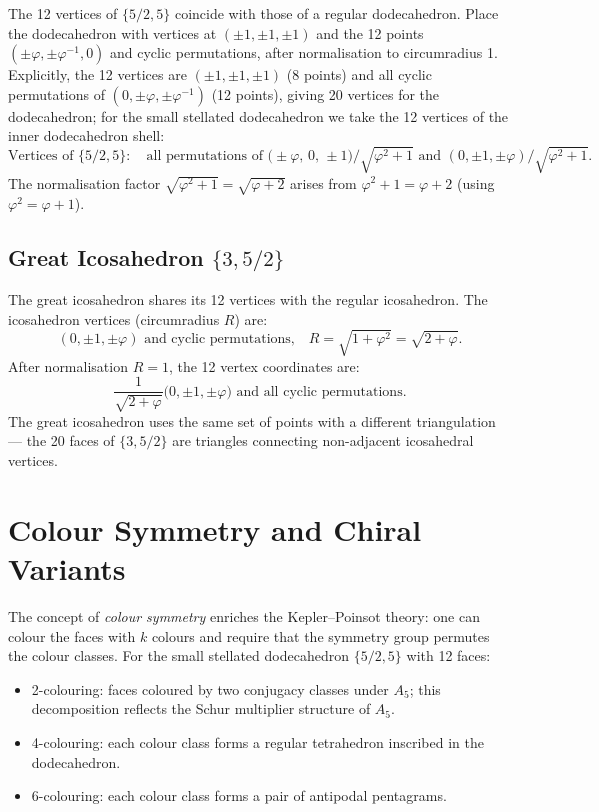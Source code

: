 The 12 vertices of $\{5/2,5\}$ coincide with those of a
regular dodecahedron.  Place the dodecahedron with vertices
at $(\pm 1, \pm 1, \pm 1)$ and the 12 points
$(\pm\varphi, \pm\varphi^{-1}, 0)$ and cyclic permutations,
after normalisation to circumradius 1.  Explicitly, the 12
vertices are $(\pm 1, \pm 1, \pm 1)$ (8 points) and all cyclic
permutations of $(0, \pm\varphi, \pm\varphi^{-1})$ (12 points),
giving 20 vertices for the dodecahedron; for the
small stellated dodecahedron we take the 12 vertices of the
inner dodecahedron shell:
\[
  \text{Vertices of }\{5/2,5\}:\quad
  \text{all permutations of }
  \bigl(\pm\varphi,\, 0,\, \pm 1\bigr)/\sqrt{\varphi^2+1}
  \text{ and }(0,\pm 1,\pm\varphi)/\sqrt{\varphi^2+1}.
\]
The normalisation factor $\sqrt{\varphi^2+1} = \sqrt{\varphi+2}$
arises from $\varphi^2 + 1 = \varphi + 2$ (using $\varphi^2 = \varphi+1$).

\subsection{Great Icosahedron \texorpdfstring{$\{3,5/2\}$}{3,5/2}}
\label{ssec:coords-gi}

The great icosahedron shares its 12 vertices with the regular
icosahedron.  The icosahedron vertices (circumradius $R$) are:
\[
  (0, \pm 1, \pm\varphi)\text{ and cyclic permutations,}
  \quad R = \sqrt{1+\varphi^2} = \sqrt{2+\varphi}.
\]
After normalisation $R=1$, the 12 vertex coordinates are:
\[
  \frac{1}{\sqrt{2+\varphi}}\bigl(0, \pm 1, \pm\varphi\bigr)
  \text{ and all cyclic permutations.}
\]
The great icosahedron uses the same set of points with a
different triangulation — the 20 faces of $\{3,5/2\}$ are
triangles connecting non-adjacent icosahedral vertices.

\section{Colour Symmetry and Chiral Variants}
\label{sec:colour-symmetry}

The concept of \emph{colour symmetry} enriches the Kepler–Poinsot
theory: one can colour the faces with $k$ colours and require
that the symmetry group permutes the colour classes.  For the
small stellated dodecahedron $\{5/2,5\}$ with 12 faces:
\begin{itemize}
  \item 2-colouring: faces coloured by two conjugacy classes
        under $A_5$; this decomposition reflects the Schur
        multiplier structure of $A_5$.
  \item 4-colouring: each colour class forms a regular tetrahedron
        inscribed in the dodecahedron.
  \item 6-colouring: each colour class forms a pair of antipodal
        pentagrams.
\end{itemize}

